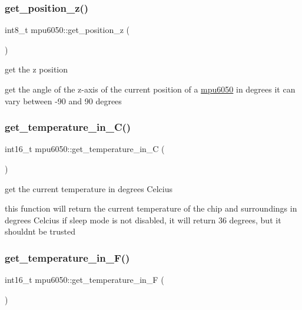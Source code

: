 \subsubsection{\texorpdfstring{get\+\_\+position\+\_\+z()}{get\_position\_z()}}
{\footnotesize\ttfamily int8\+\_\+t mpu6050\+::get\+\_\+position\+\_\+z (\begin{DoxyParamCaption}{ }\end{DoxyParamCaption})}



get the z position 

get the angle of the z-\/axis of the current position of a \hyperlink{classmpu6050}{mpu6050} in degrees it can vary between -\/90 and 90 degrees \mbox{\label{classmpu6050_ab4e29f1ab6bd4ed7aa4f6ba0a4874c6a}} 
\subsubsection{\texorpdfstring{get\+\_\+temperature\+\_\+in\+\_\+\+C()}{get\_temperature\_in\_C()}}
{\footnotesize\ttfamily int16\+\_\+t mpu6050\+::get\+\_\+temperature\+\_\+in\+\_\+C (\begin{DoxyParamCaption}{ }\end{DoxyParamCaption})}



get the current temperature in degrees Celcius 

this function will return the current temperature of the chip and surroundings in degrees Celcius if sleep mode is not disabled, it will return 36 degrees, but it shouldn\textquotesingle{}t be trusted \mbox{\label{classmpu6050_a3dd7248a256c2d7f7f465fdc5e4e5da8}} 
\subsubsection{\texorpdfstring{get\+\_\+temperature\+\_\+in\+\_\+\+F()}{get\_temperature\_in\_F()}}
{\footnotesize\ttfamily int16\+\_\+t mpu6050\+::get\+\_\+temperature\+\_\+in\+\_\+F (\begin{DoxyParamCaption}{ }\end{DoxyParamCaption})}



